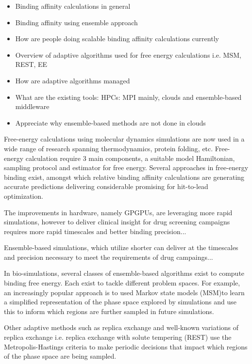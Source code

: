 \begin{itemize}
  \item Binding affinity calculations in general
  \item Binding affinity using ensemble approach
  \item How are people doing scalable binding affinity calculations currently
  \item Overview of adaptive algorithms used for free energy calculations i.e. 
  MSM, REST, EE 
  \item How are adaptive algorithms managed
  \item What are the existing tools: HPCs: MPI mainly, clouds and 
  ensemble-based middleware 
  \item Appreciate why ensemble-based methods are not done in clouds
\end{itemize}

Free-energy calculations using molecular dynamics simulations are now used in 
a wide range of research spanning thermodynamics, protein folding, etc. 
Free-energy calculation require 3 main components, a suitable model Hamiltonian,
sampling protocol and estimator for free energy. Several approaches in 
free-energy binding exist, amongst which relative binding affinity calculations 
are generating accurate predictions delivering considerable promising for
hit-to-lead optimization. 

The improvements in hardware, namely GPGPUs, are leveraging more rapid 
simulations, however to deliver clinical insight for drug screening campaigns 
requires more rapid timescales and better binding precision...

Ensemble-based simulations, which utilize shorter can deliver at the timescales
and precision necessary to meet the requirements of drug campaings...

In bio-simulations, several classes of ensemble-based algorithms exist to 
compute binding free energy. Each exist to tackle different problem spaces. 
For example, an increasingly popular approach is to
used Markov state models (MSM)to learn a simplified representation of the
phase space explored by simulations and use this to inform which regions are
further sampled in future simulations.

Other adaptive methods such as replica exchange and well-known variations of
replica exchange i.e. replica exchange with solute tempering (REST) use the
Metropolis-Hastings criteria to make periodic decisions that impact which
regions of the phase space are being sampled.

